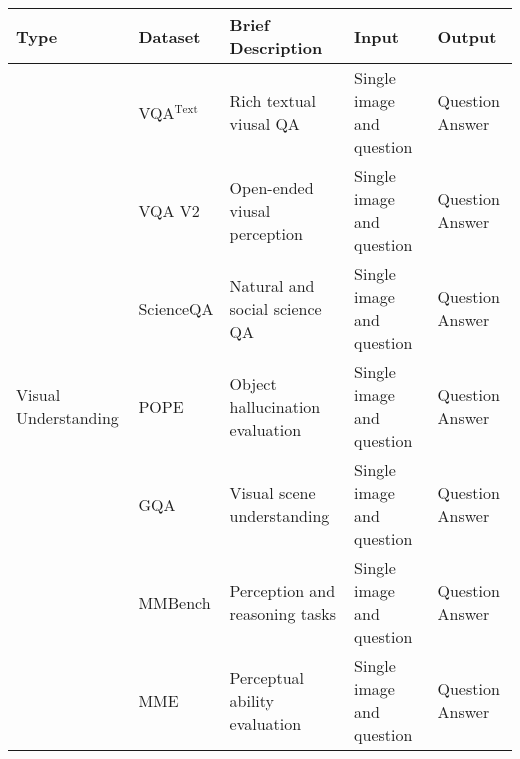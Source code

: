 \begin{table*}[t]
    \centering
    \footnotesize
    \renewcommand{\arraystretch}{1}
    \setlength\tabcolsep{6pt}
    \begin{tabular}{lllll}
        \toprule
        \bf{Type}                                  & \bf{Dataset}                         & \bf{Brief Description}                                     & \bf{Input}                                                        & \bf{Output}                                            \\
        \midrule
        \multirow{10}{1.8cm}{Visual Understanding} & \multirow{1}{*}{VQA$^\text{Text}$}            & \multirow{1}{*}{Rich textual viusal QA}                    & \multirow{1}{*}{Single image and question}          & Question Answer                                        \\
        \cmidrule{2-5}
                                                   & \multirow{1}{*}{VQA V2}              & \multirow{1}{*}{Open-ended viusal perception}              & \multirow{1}{*}{Single image and question}     & Question Answer                                        \\
        \cmidrule{2-5}
                                                   & \multirow{1}{*}{ScienceQA}           & \multirow{1}{*}{Natural and social science QA}             & \multirow{1}{*}{Single image and question}     & Question Answer                                        \\
        \cmidrule{2-5}
                                                   & \multirow{1}{*}{POPE}                & \multirow{1}{*}{Object hallucination evaluation}           & \multirow{1}{*}{Single image and question}     & Question Answer                                        \\
        \cmidrule{2-5}
                                                   & \multirow{1}{*}{GQA}                 & \multirow{1}{*}{Visual scene understanding}                & \multirow{1}{*}{Single image and question}     & Question Answer                                        \\
        \cmidrule{2-5}
                                                   & \multirow{1}{*}{MMBench}             & \multirow{1}{*}{Perception and reasoning tasks}            & \multirow{1}{*}{Single image and question}     & Question Answer                                        \\
        \cmidrule{2-5}
                                                   & \multirow{1}{*}{MME}                 & \multirow{1}{*}{Perceptual ability evaluation}             & \multirow{1}{*}{Single image and question}     & Question Answer                                        \\

\end{tabular}
\end{table*}
